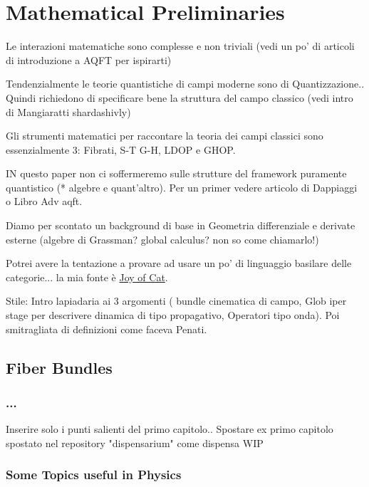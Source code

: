 \documentclass[Main]{subfiles}
\begin{document}
\chapter{Mathematical Preliminaries}
	\begin{Warning}
		Le interazioni matematiche sono complesse  e non triviali (vedi un po' di articoli di introduzione a AQFT per ispirarti)
		
		Tendenzialmente le teorie quantistiche di campi moderne sono di Quantizzazione.. Quindi richiedono di specificare bene la struttura del campo classico (vedi intro di Mangiaratti shardashivly)
		
		Gli strumenti matematici per raccontare la teoria dei campi classici sono essenzialmente 3: Fibrati, S-T G-H, LDOP e GHOP.
		
		IN questo paper non ci soffermeremo sulle strutture del framework puramente quantistico (* algebre e quant'altro). Per un primer vedere articolo di Dappiaggi o Libro Adv aqft.
		
		Diamo per scontato un background di base in Geometria differenziale e derivate esterne (algebre di Grassman? global calculus? non so come chiamarlo!)
		
		Potrei avere la tentazione a provare ad usare un po' di linguaggio basilare delle categorie... la mia fonte è \href{http://katmat.math.uni-bremen.de/acc/acc.pdf}{Joy of Cat}.
	\end{Warning}
	
	\begin{Warning}
		Stile: Intro lapiadaria ai 3 argomenti ( bundle cinematica di campo, Glob iper stage per descrivere dinamica di tipo propagativo, Operatori tipo onda). Poi smitragliata di definizioni come faceva Penati.
	\end{Warning}	
	
	\section{Fiber Bundles}
		\subsection{...}
			\begin{Warning}
				Inserire solo i punti salienti del primo capitolo.. Spostare ex primo capitolo spostato nel  repository "dispensarium" come dispensa WIP
			\end{Warning}			
						
		\subsection{Some Topics useful in Physics}
\end{document}
